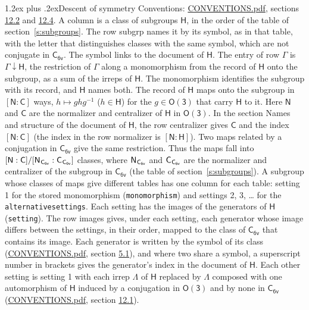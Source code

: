 \documentclass[10pt,a4paper]{article}
\makeatletter
\renewcommand\section{\@startsection{section}{1}{\z@}{-3ex plus -1ex minus -.2ex}%
  {1.2ex plus .2ex}{\normalfont\large\sffamily\bfseries\color{parttitle}}}
\numberwithin{equation}{section}
\newcommand{\grp}[1]{\mathsf{#1}}
\newcommand{\grpindex}[2]{[#1 : #2]}
\newcommand{\restr}[2]{#1\!\downarrow#2}
\newcommand{\hairsp}{\mkern1mu}
\makeatother
\begin{document}
\section{Descent of symmetry}\label{s:subduction}
Conventions: \href{../../CONVENTIONS.pdf}{CONVENTIONS.pdf}, sections \href{../../CONVENTIONS.pdf\#conv.12.2}{12.2} and \href{../../CONVENTIONS.pdf\#conv.12.4}{12.4}.
A column is a class of subgroups $\grp{H}$, in the order of the table of section~\ref{s:subgroups}. The row subgrp names it by its symbol, as in that table, with the letter that distinguishes classes with the same symbol, which are not conjugate in $\grp{C_{6v}}$. The symbol links to the document of $\grp{H}$. The entry of row $\Gamma$ is $\restr{\Gamma}{\grp{H}}$, the restriction of $\Gamma$ along a monomorphism from the record of $\grp{H}$ onto the subgroup, as a sum of the irreps of $\grp{H}$. The monomorphism identifies the subgroup with its record, and $\grp{H}$ names both. \label{n:group.normalizer.o3}\label{n:group.centralizer.o3}The record of $\grp{H}$ maps onto the subgroup in $\grpindex{\grp{N}}{\grp{C}}$ ways, $h \mapsto g h g^{-1}$ ($h \in \grp{H}$) for the $g \in \grp{O(3)}$ that carry $\grp{H}$ to it. Here $\grp{N}$ and $\grp{C}$ are the normalizer and centralizer of $\grp{H}$ in \href{O3.pdf}{$\grp{O(3)}$}. In the section Names and structure of the document of $\grp{H}$, the row centralizer gives $\grp{C}$ and the index $\grpindex{\grp{N}}{\grp{C}}$ (the index in the row normalizer is $\grpindex{\grp{N}}{\grp{H}}$). Two maps related by a conjugation in $\grp{C_{6v}}$ give the same restriction. Thus the maps fall into $\grpindex{\grp{N}}{\grp{C}}/\grpindex{\grp{N}_{\hairsp \grp{C_{6v}}}}{\grp{C}_{\hairsp \grp{C_{6v}}}}$ classes, where $\grp{N}_{\hairsp \grp{C_{6v}}}$ and $\grp{C}_{\hairsp \grp{C_{6v}}}$ are the normalizer and centralizer of the subgroup in $\grp{C_{6v}}$ (the table of section~\ref{s:subgroups}). \label{n:head.setting}A subgroup whose classes of maps give different tables has one column for each table: setting 1 for the stored monomorphism (\texttt{monomorphism}) and settings 2, 3, \dots{} for the \texttt{alternativesettings}. Each setting has the images of the generators of $\grp{H}$ (\texttt{setting}). \label{n:head.images}The row images gives, under each setting, each generator whose image differs between the settings, in their order, mapped to the class of $\grp{C_{6v}}$ that contains its image. Each generator is written by the symbol of its class (\href{../../CONVENTIONS.pdf}{CONVENTIONS.pdf}, section \href{../../CONVENTIONS.pdf\#conv.5.1}{5.1}), and where two share a symbol, a superscript number in brackets gives the generator's index in the document of $\grp{H}$. \label{n:irrep.Delta}Each other setting is setting 1 with each irrep $\Lambda$ of $\grp{H}$ replaced by $\Lambda$ composed with one automorphism of $\grp{H}$ induced by a conjugation in \href{O3.pdf}{$\grp{O(3)}$} and by none in $\grp{C_{6v}}$ (\href{../../CONVENTIONS.pdf}{CONVENTIONS.pdf}, section \href{../../CONVENTIONS.pdf\#conv.12.1}{12.1}).
\end{document}
